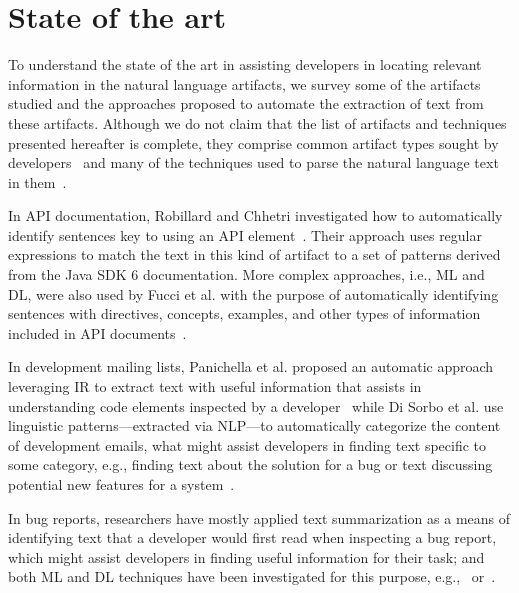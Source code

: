 \section{State of the art}
\label{cp1:novelty}


To understand the state of the art
in assisting developers in locating relevant information in the natural language artifacts, 
we survey some of the artifacts studied and 
the approaches proposed to
automate the extraction of text from these artifacts.
Although we do not claim that the list of artifacts and techniques presented hereafter is complete,
they comprise common artifact types sought by developers~\cite{umarji2008archetypal, Li2013}
and many of the techniques used to parse the natural language text in them~\cite{arnaoudova2015}.







In API documentation, Robillard and Chhetri investigated how to automatically identify 
sentences key to using an API element~\cite{Robillard2015}.
Their approach uses regular expressions to match the text in this kind of artifact 
to a set of patterns derived from the Java SDK 6 documentation.
More complex approaches, i.e.,  \acf{ML} and \acf{DL},
were also used by Fucci et al.
with the purpose of automatically identifying sentences with 
directives, concepts, examples, and other types of information included in API documents~\cite{fucci2019}.



In development mailing lists, Panichella et al. 
proposed an automatic approach leveraging \acf{IR} to extract 
text with useful information that assists in understanding code elements inspected by a developer~\cite{panichella2012}
while Di Sorbo et al. use linguistic patterns---extracted via \acf{NLP}---to
automatically categorize the content of development emails, what might 
assist developers in finding text specific to some category, e.g., 
finding text about the solution for a bug or text discussing potential 
new features for a system~\cite{Sorbo2015}.



In bug reports, researchers have mostly applied text summarization
as a means of identifying text that a developer would first read when inspecting a bug report, 
which might assist developers in finding useful information for their task;
and both \acs{ML} and 
\acs{DL} techniques have been investigated for this purpose, 
e.g.,~\cite{Lotufo2012} or~\cite{li2018deep}.



